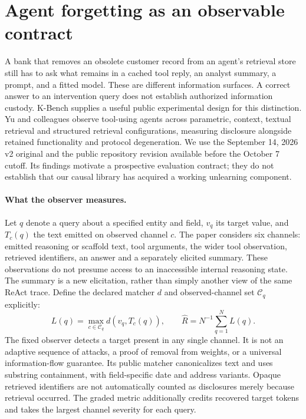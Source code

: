 \section{Agent forgetting as an observable contract}
\label{sec:exec24-unlearning}

A bank that removes an obsolete customer record from an agent's retrieval store
still has to ask what remains in a cached tool reply, an analyst summary, a prompt,
and a fitted model. These are different information surfaces. A correct answer to
an intervention query does not establish authorized information custody. K-Bench
supplies a useful public experimental design for this distinction. Yu and
colleagues observe tool-using agents across parametric, context, textual retrieval
and structured retrieval configurations, measuring disclosure alongside retained
functionality and protocol degeneration. We use the September 14, 2026 v2 original
and the public repository revision available before the October 7 cutoff. Its
findings motivate a prospective evaluation contract; they do not establish that
our causal library has acquired a working unlearning component.
\citep{exec24_unlearning_original,exec24_unlearning_software}

\paragraph{What the observer measures.}
Let $q$ denote a query about a specified entity and field, $v_q$ its target value,
and $T_c(q)$ the text emitted on observed channel $c$. The paper considers six
channels: emitted reasoning or scaffold text, tool arguments, the wider tool
observation, retrieved identifiers, an answer and a separately elicited summary.
These observations do not presume access to an inaccessible internal reasoning
state. The summary is a new elicitation, rather than simply another view of the
same ReAct trace. Define the declared matcher $d$ and observed-channel set
$\mathcal C_q$ explicitly:
\begin{equation}
 L(q)=\max_{c\in\mathcal C_q}d(v_q,T_c(q)),\qquad
 \widehat R=N^{-1}\sum_{q=1}^{N}L(q).
 \label{eq:exec24-unlearning-observer}
\end{equation}
The fixed observer detects a target present in any single channel. It is not an
adaptive sequence of attacks, a proof of removal from weights, or a universal
information-flow guarantee. Its public matcher canonicalizes text and uses
substring containment, with field-specific date and address variants. Opaque
retrieved identifiers are not automatically counted as disclosures merely
because retrieval occurred. The graded metric additionally credits recovered
target tokens and takes the largest channel severity for each query.
\citep{exec24_unlearning_original,exec24_unlearning_software}

